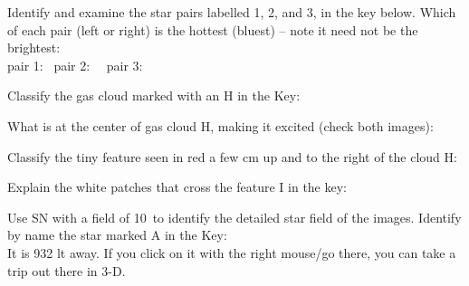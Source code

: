 \documentclass[12pt]{article}
\begin{document}
\bigskip
\noindent
Identify and examine the star pairs labelled 1, 2, and 3, in the key
below.
Which of each pair (left or right) is the hottest (bluest) -- note it need not be the
brightest: \\
pair 1: \makebox[4cm]{\hrulefill} \  pair 2: \makebox[4cm]{\hrulefill}
\ \
pair 3:  \makebox[4cm]{\hrulefill}

\bigskip
\noindent
Classify the gas cloud marked with an H in the Key:  \makebox[4cm]{\hrulefill}

\bigskip
\noindent
What is at the center of gas cloud H, making it excited (check both images): 
\makebox[4cm]{\hrulefill}

\bigskip
\noindent
Classify the tiny feature seen in red a few cm up and to the right of
the cloud H:   \makebox[4cm]{\hrulefill}

\bigskip
\noindent
Explain the white patches that cross the feature I in the key: \makebox[4cm]{\hrulefill}


\bigskip
\noindent
Use SN with a field of 10\deg\ to identify the detailed star field of the
images.  Identify by name the star marked A in the Key:
\makebox[4cm]{\hrulefill} \\
It is 932 lt away. If you click on it with the right mouse/go there,
you can take a trip out there in 3-D.
\end{document}
